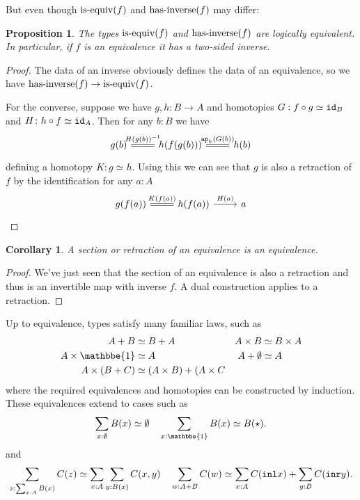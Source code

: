 \documentclass{amsart}
\theoremstyle{theorem}
\newtheorem*{cor}{Corollary}
\newtheorem*{prop}{Proposition}
\theoremstyle{definition}
\theoremstyle{remark}
\newcommand{\0}{\mathbbe{0}}
\newcommand{\1}{\mathbbe{1}}
\newcommand{\2}{\mathbbe{2}}
\newcommand{\3}{\mathbbe{3}}
\newcommand{\4}{\mathbbe{4}}
\newcommand{\term}[1]{{\textup{\texttt{#1}}}}
\newcommand{\type}[1]{{\textup{#1}}}
\newcommand{\id}{\term{id}}
\newcommand{\inl}{\term{inl}}
\newcommand{\inr}{\term{inr}}
\newcommand{\ap}{\term{ap}}
\begin{document}
But even though $\type{is-equiv}(f)$ and $\type{has-inverse}(f)$ may differ:

\begin{prop} The types $\type{is-equiv}(f)$ and $\type{has-inverse}(f)$ are logically equivalent. In particular, if $f$ is an equivalence it has a two-sided inverse.
\end{prop}
\begin{proof}
The data of an inverse obviously defines the data of an equivalence, so we have $\type{has-inverse}(f) \to \type{is-equiv}(f)$.

For the converse, suppose we have $g,h \colon B \to A$ and homotopies $G : f \circ g \simeq \id_B$ and $H \colon h \circ f \simeq \id_A$.  Then for any $b : B$ we have
\[
\begin{tikzcd} g(b) \arrow[r, equals, "H(g(b))^{-1}"] & h(f(g(b))) \arrow[r, equals, "\ap_h(G(b))"] & h(b)
\end{tikzcd}
\]
defining a homotopy $K \colon g \simeq h$. Using this we can see that $g$ is also a retraction of $f$ by the identification for any $a :A$
\[
\begin{tikzcd} g(f(a)) \arrow[r, "K(f(a))", equals] & h(f(a)) \arrow[r, "H(a)"] & a
\end{tikzcd}
\]
\end{proof}

\begin{cor} A section or retraction of an equivalence is an equivalence. 
\end{cor}
\begin{proof}
We've just seen that the section of an equivalence is also a retraction and thus is an invertible map with inverse $f$. A dual construction applies to a retraction.
\end{proof}

Up to equivalence, types satisfy many familiar laws, such as
\begin{align*}
A+B &\simeq B + A & A \times B &\simeq B \times A\\
A \times \1 &\simeq A & A+\emptyset &\simeq A \\
A \times (B + C) &\simeq (A \times B) + (A \times C
 \end{align*}
where the required equivalences and homotopies can be constructed by induction. These equivalences extend to cases such as
\[ \sum_{x : \emptyset} B(x) \simeq \emptyset \quad \sum_{x : \1}B(x)\simeq B(\star).\]
and
\[ \sum_{z : \sum_{x : A}B(x)} C(z) \simeq \sum_{x :A} \sum_{y : B(x)} C(x,y) \quad \sum_{w : A +B}C(w) \simeq \sum_{x :A} C(\inl x) + \sum_{y : B} C(\inr y).\]
\end{document}
